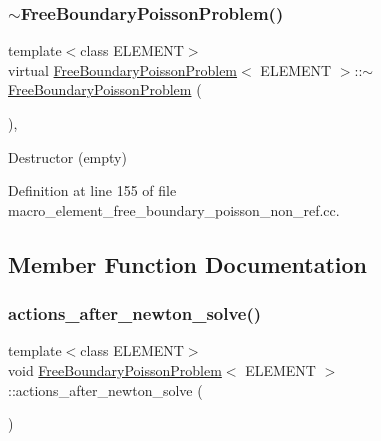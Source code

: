 \subsubsection{\texorpdfstring{$\sim$\+Free\+Boundary\+Poisson\+Problem()}{~FreeBoundaryPoissonProblem()}\hspace{0.1cm}{\footnotesize\ttfamily [2/2]}}
{\footnotesize\ttfamily template$<$class E\+L\+E\+M\+E\+NT$>$ \\
virtual \hyperlink{classFreeBoundaryPoissonProblem}{Free\+Boundary\+Poisson\+Problem}$<$ E\+L\+E\+M\+E\+NT $>$\+::$\sim$\hyperlink{classFreeBoundaryPoissonProblem}{Free\+Boundary\+Poisson\+Problem} (\begin{DoxyParamCaption}{ }\end{DoxyParamCaption})\hspace{0.3cm}{\ttfamily [inline]}, {\ttfamily [virtual]}}



Destructor (empty) 



Definition at line 155 of file macro\+\_\+element\+\_\+free\+\_\+boundary\+\_\+poisson\+\_\+non\+\_\+ref.\+cc.



\subsection{Member Function Documentation}
\mbox{\label{classFreeBoundaryPoissonProblem_aa18df6c9a9287f67ae1bff0f67aaa625}} 
\subsubsection{\texorpdfstring{actions\+\_\+after\+\_\+newton\+\_\+solve()}{actions\_after\_newton\_solve()}\hspace{0.1cm}{\footnotesize\ttfamily [1/2]}}
{\footnotesize\ttfamily template$<$class E\+L\+E\+M\+E\+NT$>$ \\
void \hyperlink{classFreeBoundaryPoissonProblem}{Free\+Boundary\+Poisson\+Problem}$<$ E\+L\+E\+M\+E\+NT $>$\+::actions\+\_\+after\+\_\+newton\+\_\+solve (\begin{DoxyParamCaption}{ }\end{DoxyParamCaption})\hspace{0.3cm}{\ttfamily [inline]}}



